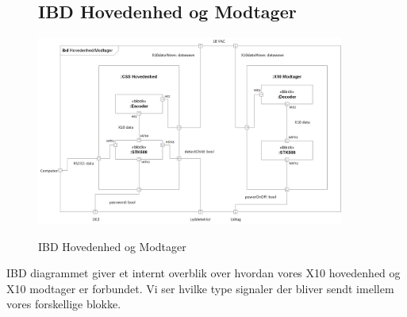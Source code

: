 \begin{figure}[!htbp] \centering
\subsection{IBD Hovedenhed og Modtager}
{\includegraphics[width=0.9\textwidth]{billeder/diagrammer/IBD_Hovedenhed_Modtager}}
\caption{IBD Hovedenhed og Modtager}
\label{lab:ibdhovedenhedmodtager}
\raggedright
\end{figure}
IBD diagrammet giver et internt overblik over hvordan vores X10 hovedenhed og X10 modtager er forbundet. Vi ser hvilke type signaler der bliver sendt imellem vores forskellige blokke.


\clearpage
\newpage

